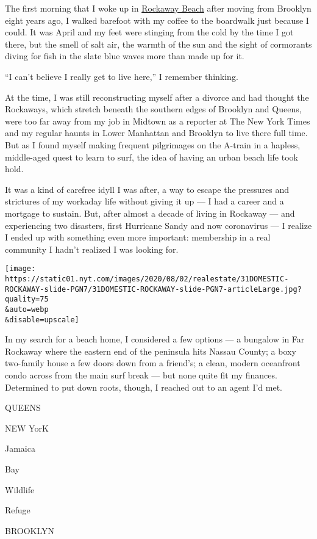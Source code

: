 The first morning that I woke up in
\href{https://www.nytimes.com/2016/06/05/realestate/rockaway-beach-city-life-with-sand-and-surf.html}{Rockaway
Beach} after moving from Brooklyn eight years ago, I walked barefoot
with my coffee to the boardwalk just because I could. It was April and
my feet were stinging from the cold by the time I got there, but the
smell of salt air, the warmth of the sun and the sight of cormorants
diving for fish in the slate blue waves more than made up for it.

``I can't believe I really get to live here,'' I remember thinking.

At the time, I was still reconstructing myself after a divorce and had
thought the Rockaways, which stretch beneath the southern edges of
Brooklyn and Queens, were too far away from my job in Midtown as a
reporter at The New York Times and my regular haunts in Lower Manhattan
and Brooklyn to live there full time. But as I found myself making
frequent pilgrimages on the A-train in a hapless, middle-aged quest to
learn to surf, the idea of having an urban beach life took hold.

It was a kind of carefree idyll I was after, a way to escape the
pressures and strictures of my workaday life without giving it up --- I
had a career and a mortgage to sustain. But, after almost a decade of
living in Rockaway --- and experiencing two disasters, first Hurricane
Sandy and now coronavirus --- I realize I ended up with something even
more important: membership in a real community I hadn't realized I was
looking for.

\texttt{[image: https://static01.nyt.com/images/2020/08/02/realestate/31DOMESTIC-ROCKAWAY-slide-PGN7/31DOMESTIC-ROCKAWAY-slide-PGN7-articleLarge.jpg?quality=75\\\&auto=webp\\\&disable=upscale]}

In my search for a beach home, I considered a few options --- a bungalow
in Far Rockaway where the eastern end of the peninsula hits Nassau
County; a boxy two-family house a few doors down from a friend's; a
clean, modern oceanfront condo across from the main surf break --- but
none quite fit my finances. Determined to put down roots, though, I
reached out to an agent I'd met.

QUEENS

NEW YorK

Jamaica

Bay

Wildlife

Refuge

BROOKLYN

